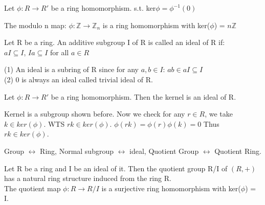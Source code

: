 \documentclass{article}
\newcommand\Z{\ensuremath{\mathbb{Z}}}
\begin{document}
\begin{Def}
    Let $\phi: R \rightarrow R'$ be a  ring homomorphism. s.t. ker$\phi = \phi^{-1}(0)$
\end{Def}

\begin{Example}
    The modulo n map: $\phi: \Z \rightarrow \Z_n$ is a ring homomorphism with ker($\phi$) = $n\Z$
\end{Example}

\begin{Def}
    Let R be a ring. An additive subgroup I of R is called an ideal of R if:
    \\ $aI\subseteq I$, $Ia \subseteq I$ for all $a \in R$
\end{Def}
\begin{note}
    (1) An ideal is a subring of R since for any $a,b \in I$:  $ab \in aI \subseteq I$
    \\(2) {0} is always an ideal called trivial ideal of R.
\end{note}
\begin{theorem}
    Let $\phi: R \rightarrow R'$ be a ring homomorphism. Then the kernel is an ideal of R.
\end{theorem}
\begin{Proof}
    Kernel is a subgroup shown before. Now we check for any $r\in R$, we take $k \in ker(\phi)$. WTS $rk \in ker(\phi)$.
    $\phi(rk) = \phi(r) \phi(k) = 0$ Thus $rk \in ker(\phi)$.
\end{Proof}

\begin{note}
    Group $\leftrightarrow$ Ring, Normal subgroup $\leftrightarrow$ ideal,
    Quotient Group $\leftrightarrow$ Quotient Ring.
\end{note}

\begin{theorem}
    Let R be a ring and I be an ideal of it.
    Then the quotient group R/I of $(R, +)$ has a natural ring structure induced from the ring R.
    \\ The quotient map $\phi: R \rightarrow R/I$ is a surjective ring homomorphism with ker($\phi$) = I.
\end{theorem}
\end{document}
